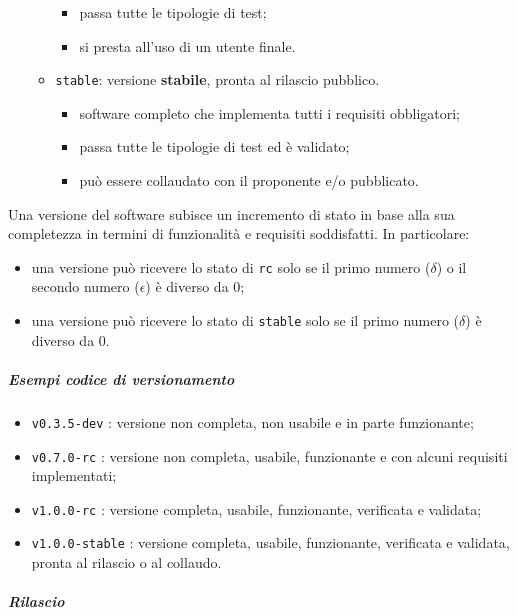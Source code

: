 \begin{itemize}
\begin{itemize}
\begin{itemize}
					\item passa tutte le tipologie di test;
					\item si presta all'uso di un utente finale.
				\end{itemize}
				\item \verb!stable!: versione \textbf{stabile}, pronta al rilascio pubblico.
				\begin{itemize}
					\item software completo che implementa tutti i requisiti obbligatori;
					\item passa tutte le tipologie di test ed è validato;
					\item può essere collaudato con il proponente e/o pubblicato.
				\end{itemize}
			\end{itemize}
		\end{itemize}

		Una versione del software subisce un incremento di stato in base alla sua completezza in termini di funzionalità e requisiti soddisfatti. In particolare:
		\begin{itemize}
			\item una versione può ricevere lo stato di \verb!rc! solo se il primo numero (\(\delta\)) o il secondo numero (\(\epsilon\)) è diverso da 0;
			\item una versione può ricevere lo stato di \verb!stable! solo se il primo numero (\(\delta\)) è diverso da 0.
		\end{itemize}

		\subparagraph{Esempi codice di versionamento}

		\begin{itemize}
			\item \verb!v0.3.5-dev! : versione non completa, non usabile e in parte funzionante;
			\item \verb!v0.7.0-rc! : versione non completa, usabile, funzionante e con alcuni requisiti implementati;
			\item \verb!v1.0.0-rc! : versione completa, usabile, funzionante, verificata e validata;
			\item \verb!v1.0.0-stable! : versione completa, usabile, funzionante, verificata e validata, pronta al rilascio o al collaudo.
		\end{itemize}

		\subparagraph{Rilascio}

